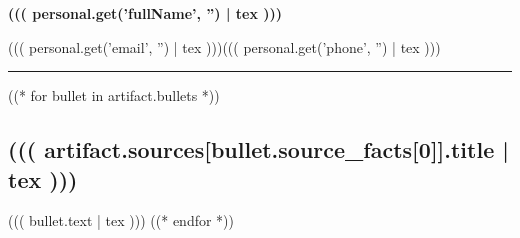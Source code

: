 \documentclass[UTF8,11pt,fontset=fandol]{ctexart}
\begin{document}
{\LARGE\bfseries ((( personal.get('fullName', '') | tex )))}

((( personal.get('email', '') | tex )))\quad ((( personal.get('phone', '') | tex )))

\vspace{3mm}\hrule\vspace{3mm}
((* for bullet in artifact.bullets *))
\subsection*{((( artifact.sources[bullet.source_facts[0]].title | tex )))}
((( bullet.text | tex )))
((* endfor *))
\end{document}
